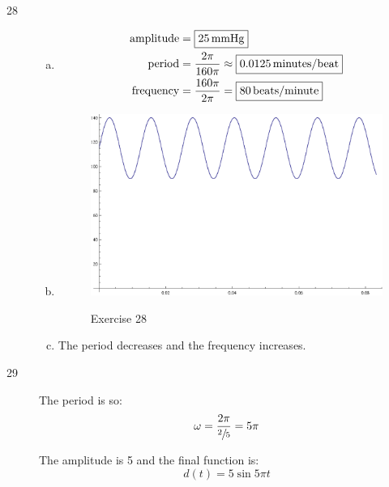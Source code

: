 \documentclass{exam}
\begin{document}
\begin{description}
      \item[28]
        \pagebreak
        \begin{enumerate}[(a)]
          \item 
            \begin{align*}
              \text{amplitude} & = \boxed{ \unit[25]{mmHg} } \\
              \text{period}    & = \frac{2 \pi}{160 \pi} \approx \boxed{ \unit[0.0125]{minutes/beat} } \\
              \text{frequency} & = \frac{160 \pi}{2 \pi} = \boxed{ \unit[80]{beats/minute} } \\
            \end{align*}

          \item 
            \begin{figure}[H]
              \centering
              \includegraphics[scale=0.6]{exercise28.eps}

              Exercise 28
            \end{figure}

          \item The period decreases and the frequency increases.

        \end{enumerate}

      \item[29] The period is  so: 
        \[
        \omega = \frac{2 \pi}{\sfrac{2}{5}} = 5 \pi
        \]

        The amplitude is 5 and the final function is:
        \[
          \boxed{ d(t) = 5 \sin 5 \pi t }
        \]

      \pagebreak


\end{description}
\end{document}
